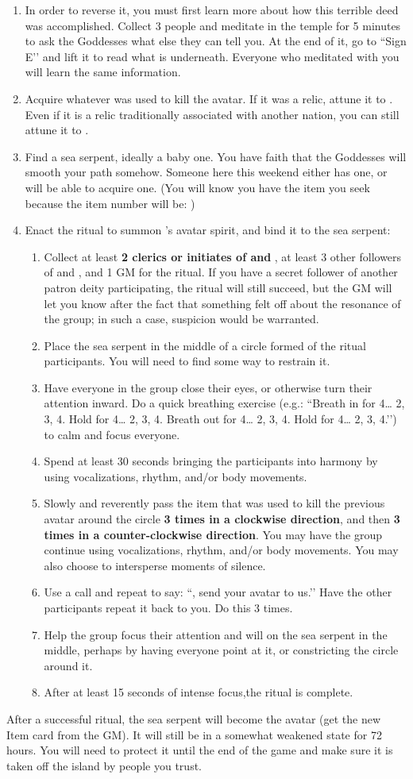 \documentclass[green]{GL2020}
\begin{document}
\begin{enumerate}
  \item In order to reverse it, you must first learn more about how this terrible deed was accomplished. Collect 3 people and meditate in the temple for 5 minutes to ask the Goddesses what else they can tell you. At the end of it, go to ``Sign E’’ and lift it to read what is underneath. Everyone who meditated with you will learn the same information.
  \item Acquire whatever was used to kill the \cEbb{} avatar. If it was a relic, attune it to \pShip{}. Even if it is a relic traditionally associated with another nation, you can still attune it to \pShip{}.
  \item Find a sea serpent, ideally a baby one. You have faith that the Goddesses will smooth your path somehow. Someone here this weekend either has one, or will be able to acquire one. (You will know you have the item you seek because the item number will be: \iBabySeaSerpent{\MYnumber})
  \item Enact the ritual to summon \cEbb{}’s avatar spirit, and bind it to the sea serpent:
  \begin{enumerate}
    \item Collect at least \textbf{2 clerics or initiates of \cEbb{} and \cFlow{}}, at least 3 other followers of \cEbb{} and \cFlow{}, and 1 GM for the ritual. If you have a secret follower of another patron deity participating, the ritual will still succeed, but the GM will let you know after the fact that something felt off about the resonance of the group; in such a case, suspicion would be warranted. 
    \item Place the sea serpent in the middle of a circle formed of the ritual participants. You will need to find some way to restrain it.
    \item Have everyone in the group close their eyes, or otherwise turn their attention inward. Do a quick breathing exercise (e.g.: ``Breath in for 4… 2, 3, 4. Hold for 4… 2, 3, 4. Breath out for 4… 2, 3, 4. Hold for 4… 2, 3, 4.’’) to calm and focus everyone.
    \item Spend at least 30 seconds bringing the participants into harmony by using vocalizations, rhythm, and/or body movements.
    \item Slowly and reverently pass the item that was used to kill the previous avatar around the circle \textbf{3 times in a clockwise direction}, and then \textbf{3 times in a counter-clockwise direction}. You may have the group continue using vocalizations, rhythm, and/or body movements. You may also choose to intersperse moments of silence.
    \item Use a call and repeat to say: ``\cEbb{\full}, send your avatar to us.’’ Have the other participants repeat it back to you. Do this 3 times.
    \item Help the group focus their attention and will on the sea serpent in the middle, perhaps by having everyone point at it, or constricting the circle around it.
    \item After at least 15 seconds of intense focus,the ritual is complete.
  \end{enumerate}
\end{enumerate}

After a successful ritual, the sea serpent will become the \cEbb{} avatar (get the new Item card from the GM). It will still be in a somewhat weakened state for 72 hours. You will need to protect it until the end of the game and make sure it is taken off the island by people you trust.
\end{document}
